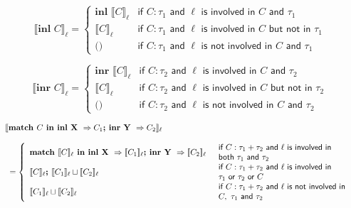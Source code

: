 \documentclass{article}
\begin{document}
$$
 \llbracket  \textbf{inl } C \rrbracket _\ell = \left\{
    \begin{array}{ll}
    \textbf{inl }\llbracket     C \rrbracket _\ell & \textsf{if } C : \tau_1 \textsf{ and } \ell \textsf{ is involved in } C \textsf{ and } \tau_1 \\
    \llbracket     C \rrbracket _\ell & \textsf{if } C : \tau_1 \textsf{ and } \ell \textsf{ is involved in } C \textsf{ but not in } \tau_1 \\
    \textbf{()} & \textsf{if } C : \tau_1 \textsf{ and } \ell \textsf{ is not involved in } C \textsf{ and } \tau_1
    \end{array}
\right.
$$

$$
 \llbracket  \textbf{inr } C \rrbracket _\ell = \left\{
    \begin{array}{ll}
    \textbf{inr }\llbracket     C \rrbracket _\ell & \textsf{if } C : \tau_2 \textsf{ and } \ell \textsf{ is involved in } C \textsf{ and } \tau_2 \\
    \llbracket     C \rrbracket _\ell & \textsf{if } C : \tau_2 \textsf{ and } \ell \textsf{ is involved in } C \textsf{ but not in } \tau_2 \\
    \textbf{()} & \textsf{if } C : \tau_2 \textsf{ and } \ell \textsf{ is not involved in } C \textsf{ and } \tau_2
    \end{array}
\right.
$$

$$\begin{array}{l}
 \llbracket  \textbf{match } C \textbf{ in inl X } \Rightarrow C_1 \textbf{; inr Y } \Rightarrow C_2 \rrbracket _\ell\\ \\ \;\;= \left\{
    \begin{array}{l l}
    \textbf{match }\llbracket C \rrbracket _\ell \textbf{ in inl X } \Rightarrow \llbracket C_1 \rrbracket _\ell \textbf{; inr Y } \Rightarrow \llbracket C_2 \rrbracket _\ell & 
    \begin{array}{l}
    \textsf{if } C : \tau_1 + \tau_2 \textsf{ and } \ell \textsf{ is involved in} \\ \textsf{both } \tau_1 \textsf{ and }\tau_2 
    \end{array}    \\
    \llbracket C \rrbracket _\ell \textbf{; } \llbracket C_1 \rrbracket _\ell \sqcup \llbracket C_2 \rrbracket _\ell & 
    \begin{array}{l}
    \textsf{if } C : \tau_1 + \tau_2 \textsf{ and } \ell \textsf{ is involved in } \\ \tau_1 \textsf{ or } \tau_2 \textsf{ or } C
    \end{array}    \\
    \llbracket C_1 \rrbracket _\ell \sqcup \llbracket C_2 \rrbracket _\ell & 
    \begin{array}{l}
    \textsf{if } C : \tau_1 + \tau_2 \textsf{ and } \ell \textsf{ is not involved in} \\ C, \ \tau_1 \textsf{ and } \tau_2 
    \end{array}
    \end{array}
\right.
\end{array}
$$
\end{document}

